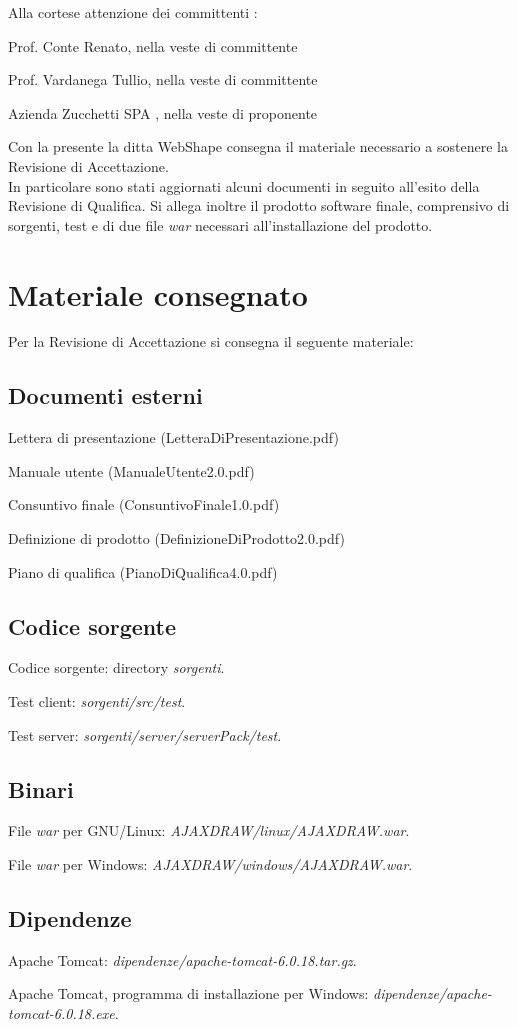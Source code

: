 Alla cortese attenzione dei committenti :
\begin{list}{-}{}
\item Prof. Conte Renato, nella veste di committente
\item Prof. Vardanega Tullio, nella veste di committente
\item Azienda Zucchetti SPA , nella veste di proponente
\end{list}

Con la presente la ditta WebShape consegna il materiale necessario a sostenere la Revisione di Accettazione. \\
In particolare sono stati aggiornati alcuni documenti in seguito all'esito della Revisione di Qualifica. Si allega inoltre il prodotto software finale, comprensivo di sorgenti, test e di due file \textit{war} necessari all'installazione del prodotto.


\section{Materiale consegnato}
Per la Revisione di Accettazione si consegna il seguente materiale: 
\subsection{Documenti esterni}
\begin{list}{-}{}
\item Lettera di presentazione (LetteraDiPresentazione.pdf)
\item Manuale utente (ManualeUtente2.0.pdf)
\item Consuntivo finale (ConsuntivoFinale1.0.pdf)
\item Definizione di prodotto (DefinizioneDiProdotto2.0.pdf)
\item Piano di qualifica (PianoDiQualifica4.0.pdf)
\end{list}
\subsection{Codice sorgente}
\begin{list}{-}{}
\item Codice sorgente: directory \textit{sorgenti}.
\item Test client: \textit{sorgenti/src/test}.
\item Test server: \textit{sorgenti/server/serverPack/test}.
\end{list}
\subsection{Binari}
\begin{list}{-}{}
\item File \textit{war} per GNU/Linux: \textit{AJAXDRAW/linux/AJAXDRAW.war}.
\item File \textit{war} per Windows: \textit{AJAXDRAW/windows/AJAXDRAW.war}.
\end{list}
\subsection{Dipendenze}
\begin{list}{-}{}
\item Apache Tomcat: \textit{dipendenze/apache-tomcat-6.0.18.tar.gz}.
\item Apache Tomcat, programma di installazione per Windows: \textit{dipendenze/apache-tomcat-6.0.18.exe}.
\end{list}



